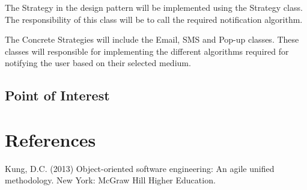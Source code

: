 \documentclass[runningheads,a4paper]{article}
\begin{document}
The Strategy in the design pattern will be implemented using the Strategy class. The responsibility of this class will be to call the required notification algorithm.

The Concrete Strategies will include the Email, SMS and Pop-up classes. These classes will responsible for implementing the different algorithms required for notifying the user based on their selected medium.


\subsection {Point of Interest}

\section{References}

Kung, D.C. (2013) Object-oriented software engineering: An agile unified methodology. New York: McGraw Hill Higher Education.
\end{document}
